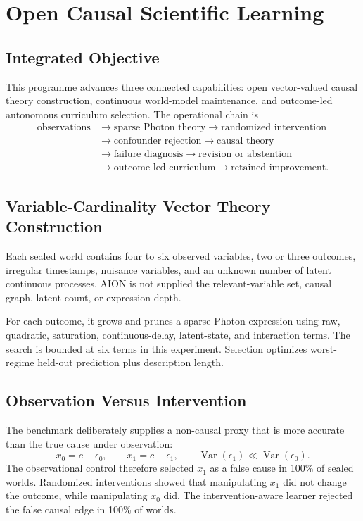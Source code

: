 \section{Open Causal Scientific Learning}
\label{sec:open-causal-scientific-learning}

\subsection{Integrated Objective}

This programme advances three connected capabilities: open vector-valued
causal theory construction, continuous world-model maintenance, and
outcome-led autonomous curriculum selection. The operational chain is
\[
\begin{aligned}
\text{observations}
&\rightarrow \text{sparse Photon theory}
\rightarrow \text{randomized intervention}\\
&\rightarrow \text{confounder rejection}
\rightarrow \text{causal theory}\\
&\rightarrow \text{failure diagnosis}
\rightarrow \text{revision or abstention}\\
&\rightarrow \text{outcome-led curriculum}
\rightarrow \text{retained improvement}.
\end{aligned}
\]

\subsection{Variable-Cardinality Vector Theory Construction}

Each sealed world contains four to six observed variables, two or three
outcomes, irregular timestamps, nuisance variables, and an unknown number of
latent continuous processes. AION is not supplied the relevant-variable set,
causal graph, latent count, or expression depth.

For each outcome, it grows and prunes a sparse Photon expression using raw,
quadratic, saturation, continuous-delay, latent-state, and interaction terms.
The search is bounded at six terms in this experiment. Selection optimizes
worst-regime held-out prediction plus description length.

\subsection{Observation Versus Intervention}

The benchmark deliberately supplies a non-causal proxy that is more accurate
than the true cause under observation:
\[
x_0=c+\epsilon_0,\qquad
x_1=c+\epsilon_1,\qquad
\operatorname{Var}(\epsilon_1)\ll\operatorname{Var}(\epsilon_0).
\]
The observational control therefore selected \(x_1\) as a false cause in
100\% of sealed worlds. Randomized interventions showed that manipulating
\(x_1\) did not change the outcome, while manipulating \(x_0\) did. The
intervention-aware learner rejected the false causal edge in 100\% of worlds.


